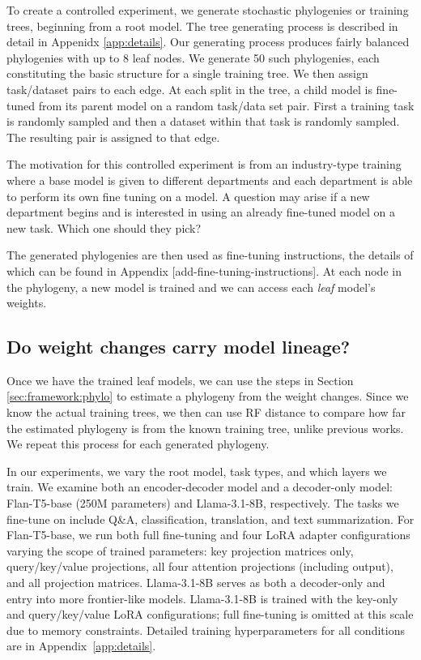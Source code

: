 \documentclass{article}
\begin{document}
To create a controlled experiment, we generate stochastic phylogenies or training trees, beginning from a root model.  The tree generating process is described in detail in Appenidx \ref{app:details}.  Our generating process produces fairly balanced phylogenies with up to 8 leaf nodes.  We generate 50 such phylogenies, each constituting the basic structure for a single training tree. We then assign task/dataset pairs to each edge. At each split in the tree, a child model is fine-tuned from its parent model on a random task/data set pair.  First a training task is randomly sampled and then a dataset within that task is randomly sampled.  The resulting pair is assigned to that edge.

The motivation for this controlled experiment is from an industry-type training where a base model is given to different departments and each department is able to perform its own fine tuning on a model.  A question may arise if a new department begins and is interested in using an already fine-tuned model on a new task.  Which one should they pick?

The generated phylogenies are then used as fine-tuning instructions, the details of which can be found in Appendix [add-fine-tuning-instructions].  At each node in the phylogeny, a new model is trained and we can access each \textit{leaf} model's weights. 

\subsection{Do weight changes carry model lineage?}
\label{sec:exp:weights}

Once we have the trained leaf models, we can use the steps in Section \ref{sec:framework:phylo} to estimate a phylogeny from the weight changes.  Since we know the actual training trees, we then can use RF distance to compare how far the estimated phylogeny is from the known training tree, unlike previous works.  We repeat this process for each generated phylogeny.

In our experiments, we vary the root model, task types, and which layers we train. We examine both an encoder-decoder model and a decoder-only model: Flan-T5-base (250M parameters) and Llama-3.1-8B, respectively. The tasks we fine-tune on include Q\&A, classification, translation, and text summarization. For Flan-T5-base, we run both full fine-tuning and four LoRA \citep{hu2022lora} adapter configurations varying the scope of trained parameters: key projection matrices only, query/key/value projections, all four attention projections (including output), and all projection matrices. Llama-3.1-8B serves as both a decoder-only and entry into more frontier-like models.  Llama-3.1-8B is trained with the key-only and query/key/value LoRA configurations; full fine-tuning is omitted at this scale due to memory constraints. Detailed training hyperparameters for all conditions are in Appendix~\ref{app:details}.
\end{document}
